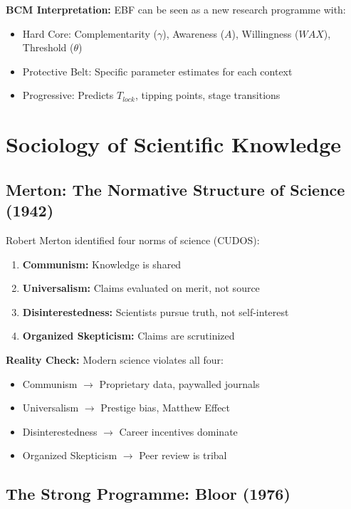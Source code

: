 \textbf{BCM Interpretation:}
EBF can be seen as a new research programme with:
\begin{itemize}
\item Hard Core: Complementarity ($\gamma$), Awareness ($A$), Willingness ($WAX$), Threshold ($\theta$)
\item Protective Belt: Specific parameter estimates for each context
\item Progressive: Predicts $T_{lock}$, tipping points, stage transitions
\end{itemize}



\section{Sociology of Scientific Knowledge}
\label{sec:meta-ssk}

\subsection{Merton: The Normative Structure of Science (1942)}

Robert Merton identified four norms of science (CUDOS):
\begin{enumerate}
\item \textbf{Communism:} Knowledge is shared
\item \textbf{Universalism:} Claims evaluated on merit, not source
\item \textbf{Disinterestedness:} Scientists pursue truth, not self-interest
\item \textbf{Organized Skepticism:} Claims are scrutinized
\end{enumerate}

\textbf{Reality Check:}
Modern science violates all four:
\begin{itemize}
\item Communism $\to$ Proprietary data, paywalled journals
\item Universalism $\to$ Prestige bias, Matthew Effect
\item Disinterestedness $\to$ Career incentives dominate
\item Organized Skepticism $\to$ Peer review is tribal
\end{itemize}

\subsection{The Strong Programme: Bloor (1976)}

